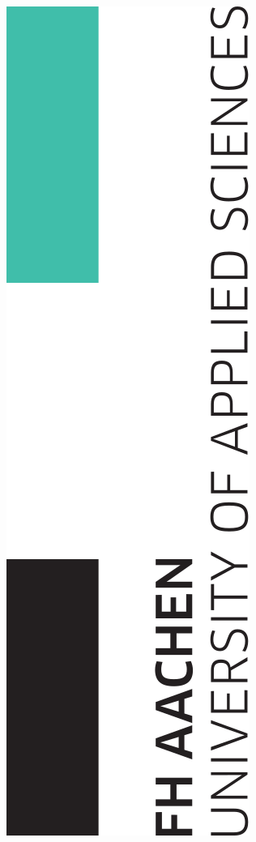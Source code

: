 \documentclass[twoside, a4paper]{article}
\institute{GET it digital}
\date{\today}
\begin{document}
\renewcommand{\partname}{Modul}
\thispagestyle{empty}
\begin{center}

	\begin{minipage}[c][2cm][c]{0.3\textwidth}
		\includegraphics[angle=270,width=\linewidth]{FHAachen-logo2010}

\end{minipage}
\end{center}
\end{document}
